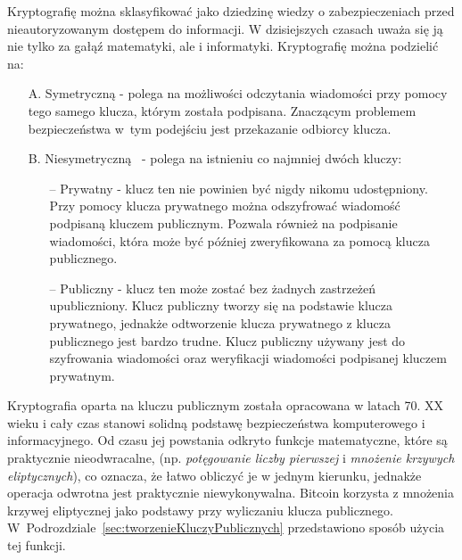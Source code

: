 \documentclass[12pt, oneside, final, openany]{mgr}
\begin{document}
\indent Kryptografię można sklasyfikować jako dziedzinę wiedzy o zabezpieczeniach przed nieautoryzowanym dostępem do informacji. W dzisiejszych czasach uważa się ją nie tylko za gałąź matematyki, ale i informatyki. Kryptografię można podzielić na:
\begin{itemize}
\item[A.] Symetryczną - polega na możliwości odczytania wiadomości przy pomocy tego samego klucza, którym została podpisana. Znaczącym problemem bezpieczeństwa w~tym podejściu jest przekazanie odbiorcy klucza. 
\item[B.] Niesymetryczną~\cite{CryptoDenga, asynchModel} - polega na istnieniu co najmniej dwóch kluczy:
\begin{itemize}
\item[--] Prywatny - klucz ten nie powinien być nigdy nikomu udostępniony. Przy pomocy klucza prywatnego można odszyfrować wiadomość podpisaną kluczem publicznym. Pozwala również na podpisanie wiadomości, która może być później zweryfikowana za pomocą klucza publicznego.
\item[--] Publiczny - klucz ten może zostać bez żadnych zastrzeżeń upubliczniony. Klucz publiczny tworzy się na podstawie klucza prywatnego, jednakże odtworzenie klucza prywatnego z klucza publicznego jest bardzo trudne. Klucz publiczny używany jest do szyfrowania wiadomości oraz weryfikacji wiadomości podpisanej kluczem prywatnym.
\end{itemize}
\end{itemize} 

\indent Kryptografia oparta na kluczu publicznym została opracowana w latach 70. XX wieku i cały czas stanowi solidną podstawę bezpieczeństwa komputerowego i informacyjnego. Od czasu jej powstania odkryto funkcje matematyczne, które są praktycznie nieodwracalne, (np. \textit{potęgowanie liczby pierwszej} i \textit{mnożenie krzywych eliptycznych}), co oznacza, że łatwo obliczyć je w jednym kierunku, jednakże operacja odwrotna jest praktycznie niewykonywalna. Bitcoin korzysta z mnożenia krzywej eliptycznej jako podstawy przy wyliczaniu klucza publicznego. W~Podrozdziale~\ref{sec:tworzenieKluczyPublicznych} przedstawiono sposób użycia tej funkcji.
\end{document}
